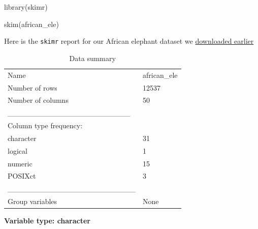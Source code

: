 \documentclass[
  letterpaper,
  DIV=11,
  numbers=noendperiod,
  oneside]{scrreprt}
\newenvironment{Shaded}{\begin{snugshade}}{\end{snugshade}}
\newcommand{\FunctionTok}[1]{\textcolor[rgb]{0.28,0.35,0.67}{#1}}
\newcommand{\NormalTok}[1]{\textcolor[rgb]{0.00,0.23,0.31}{#1}}
\begin{document}
\begin{Shaded}
\begin{Highlighting}[]
\FunctionTok{library}\NormalTok{(skimr)}

\FunctionTok{skim}\NormalTok{(african\_ele)}
\end{Highlighting}
\end{Shaded}

Here is the \texttt{skimr} report for our African elephant dataset we
\protect\hyperlink{sec-download-data}{downloaded earlier}

\begin{longtable}[]{@{}ll@{}}
\caption{Data summary}\tabularnewline
\toprule\noalign{}
\endfirsthead
\endhead
\bottomrule\noalign{}
\endlastfoot
Name & african\_ele \\
Number of rows & 12537 \\
Number of columns & 50 \\
\_\_\_\_\_\_\_\_\_\_\_\_\_\_\_\_\_\_\_\_\_\_\_ & \\
Column type frequency: & \\
character & 31 \\
logical & 1 \\
numeric & 15 \\
POSIXct & 3 \\
\_\_\_\_\_\_\_\_\_\_\_\_\_\_\_\_\_\_\_\_\_\_\_\_ & \\
Group variables & None \\
\end{longtable}

\textbf{Variable type: character}
\end{document}
